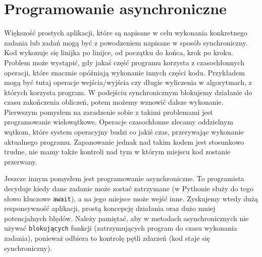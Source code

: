 \documentclass[shortabstract,inz]{iithesis}
\begin{document}
		\section{Programowanie asynchroniczne}
			Większość prostych aplikacji, które są napisane w celu wykonania konkretnego zadania lub zadań mogą być z powodzeniem napisane w sposób synchroniczny. Kod wykonuje się linijka po linijce, od początku do końca, krok po kroku. Problem może wystąpić, gdy jakaś część programu korzysta z czasochłonnych operacji, które znacznie opóźniają wykonanie innych części kodu. Przykładem mogą być tutaj operacje wejścia/wyjścia czy długie wyliczenia w algorytmach, z których korzysta program. W podejściu synchronicznym blokujemy działanie do czasu zakończenia obliczeń, potem możemy wznowić dalsze wykonanie. Pierwszym pomysłem na zaradzenie sobie z takimi problemami jest programowanie wielowątkowe. Operacje czasochłonne zlecamy oddzielnym wątkom, które system operacyjny budzi co jakiś czas, przerywając wykonanie aktualnego programu. Zapanowanie jednak nad takim kodem jest stosunkowo trudne, nie mamy także kontroli nad tym w którym miejscu kod zostanie przerwany.
		
			Jeszcze innym pomysłem jest programowanie asynchroniczne. To programista decyduje kiedy dane zadanie może zostać zatrzymane (w Pythonie służy do tego słowo kluczowe \texttt{await}), a na jego miejsce może wejść inne. Zyskujemy wtedy dużą responsywność aplikacji, prostą koncepcję działania oraz dużo mniej potencjalnych błędów. Należy pamiętać, aby w metodach asynchronicznych nie używać \texttt{blokujących} funkcji (zatrzymujących program do czasu wykonania zadania), ponieważ odbiera to kontrolę pętli zdarzeń (kod staje się synchroniczny).
		
\end{document}
